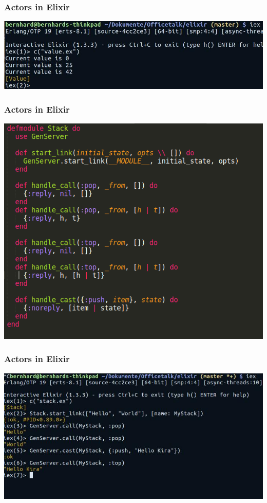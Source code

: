 \documentclass{beamer}
\begin{document}

\begin{frame}
\frametitle{Actors in Elixir}
\includegraphics[width=1\linewidth]{./images/elixir_value_terminal.jpg}
\end{frame}


\begin{frame}
\frametitle{Actors in Elixir}
\includegraphics[width=0.6\linewidth]{./images/elixir_stack.png}
\end{frame}


\begin{frame}
\frametitle{Actors in Elixir}
\includegraphics[width=1\linewidth]{./images/elixir_stack_terminal.jpg}
\end{frame}
\end{document}

